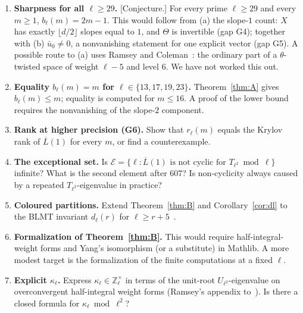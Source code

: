 \documentclass[11pt]{amsart}
\newcommand{\Zl}{\mathbb{Z}_\ell}
\newcommand{\Lb}{\overline{L}}
\newcommand{\cE}{\mathcal{E}}
\newcommand{\st}[1]{\textup{\textsf{[#1]}}}
\theoremstyle{plain}
\theoremstyle{definition}
\numberwithin{equation}{section}
\begin{document}
\begin{enumerate}[label=(\arabic*)]
\item \textbf{Sharpness for all $\ell\ge29$.} \st{Conjecture.} For every prime $\ell\ge29$ and every $m\ge1$, $b_\ell(m)=2m-1$. This would follow from
  (a) the slope-$1$ count: $X$ has exactly $\lfloor d/2\rfloor$ slopes equal to $1$, and $\Theta$ is invertible (gap G4); together with
  (b) $\bar u_0\ne0$, a nonvanishing statement for one explicit vector (gap G5). A possible route to (a) uses Ramsey and
  Coleman~\cite{FKO2012,Coleman1996}: the ordinary part of a $\theta$-twisted space of weight $\ell-5$ and level $6$.
  We have not worked this out.
\item \textbf{Equality $b_\ell(m)=m$ for $\ell\in\{13,17,19,23\}$.} Theorem~\ref{thm:A} gives $b_\ell(m)\le m$; equality is computed for
  $m\le16$. A proof of the lower bound requires the nonvanishing of the slope-$2$ component.
\item \textbf{Rank at higher precision (G6).} Show that $r_\ell(m)$ equals the Krylov rank of $\Lb(1)$ for every $m$, or find a
  counterexample.
\item \textbf{The exceptional set.} Is $\cE=\{\ell:\Lb(1)\text{ is not cyclic for }T_{\ell^2}\bmod\ell\}$ infinite? What is
  the second element after $607$? Is non-cyclicity always caused by a repeated $T_{\ell^2}$-eigenvalue in practice?
\item \textbf{Coloured partitions.} Extend Theorem~\ref{thm:B} and Corollary~\ref{cor:dl} to the BLMT invariant $d_\ell(r)$ for
  $\ell\ge r+5$~\cite{BLMT2014}.
\item \textbf{Formalization of Theorem~\ref{thm:B}.} This would require half-integral-weight forms and Yang's isomorphism (or a substitute)
  in Mathlib. A more modest target is the formalization of the finite computations at a fixed $\ell$.
\item \textbf{Explicit $\kappa_\ell$.} Express $\kappa_\ell\in\Zl^\times$ in terms of the unit-root $U_{\ell^2}$-eigenvalue on overconvergent
  half-integral weight forms (Ramsey's appendix to~\cite{FKO2012}). Is there a closed formula for $\kappa_\ell\bmod\ell^2$?
\end{enumerate}



\end{document}
